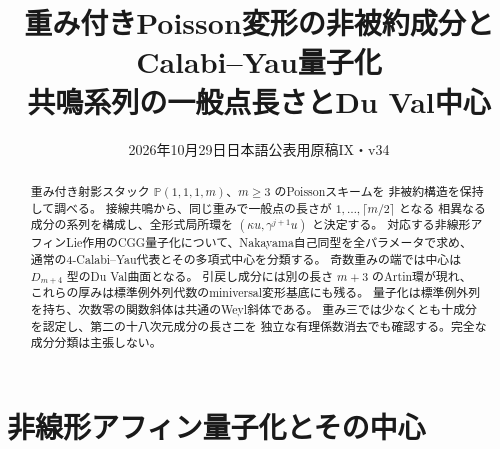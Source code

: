 
\title{重み付きPoisson変形の非被約成分と\\Calabi--Yau量子化\\
\large 共鳴系列の一般点長さとDu Val中心}
\author{}\date{2026年10月29日\quad 日本語公表用原稿IX・v34}
\maketitle
\begin{abstract}
重み付き射影スタック $\mathbb P(1,1,1,m)$、$m\ge3$ のPoissonスキームを
非被約構造を保持して調べる。
接線共鳴から、同じ重みで一般点の長さが $1,\ldots,\lceil m/2\rceil$ となる
相異なる成分の系列を構成し、全形式局所環を $(\kappa u,\gamma^{j+1}u)$ と決定する。
対応する非線形アフィンLie作用のCGG量子化について、Nakayama自己同型を全パラメータで求め、
通常の4-Calabi--Yau代表とその多項式中心を分類する。
奇数重みの端では中心は $D_{m+4}$ 型のDu Val曲面となる。
引戻し成分には別の長さ $m+3$ のArtin環が現れ、
これらの厚みは標準例外列代数のminiversal変形基底にも残る。
量子化は標準例外列を持ち、次数零の関数斜体は共通のWeyl斜体である。
重み三では少なくとも十成分を認定し、第二の十八次元成分の長さ二を
独立な有理係数消去でも確認する。完全な成分分類は主張しない。
\end{abstract}
\tableofcontents\clearpage






\section{非線形アフィン量子化とその中心}


















